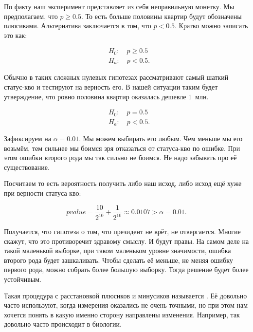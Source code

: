\documentclass[12pt, a4paper, oneside]{article}
\begin{document}
По факту наш эксперимент представляет из себя неправильную монетку. Мы предполагаем, что $p \ge 0.5$. То есть больше половины квартир будут обозначены плюсиками. Альтернатива заключается в том, что $p < 0.5$.  Кратко можно записать это как: 

\begin{equation*} 
    \begin{aligned} 
        &H_0: \quad p \ge 0.5 \\
        &H_a: \quad p < 0.5.
    \end{aligned} 
\end{equation*}

Обычно в таких сложных нулевых гипотезах рассматривают самый шаткий статус-кво и тестируют на верность его. В нашей ситуации таким будет утверждение, что ровно половина квартир оказалась дешевле $1$~млн.

\begin{equation*} 
    \begin{aligned} 
        &H_0: \quad p = 0.5 \\
        &H_a: \quad p < 0.5.
    \end{aligned} 
\end{equation*}

Зафиксируем  на $\alpha = 0.01.$ Мы можем выбирать его любым. Чем меньше мы его возьмём, тем сильнее мы боимся зря отказаться от статуса-кво по ошибке. При этом ошибки второго рода мы так сильно не боимся. Не надо забывать про её существование. 

Посчитаем  то есть вероятность получить либо наш исход, либо исход ещё хуже при верности статуса-кво: 

$$
pvalue = \frac{10}{2^{10}} + \frac{1}{2^{10}} \approx 0.0107 > \alpha = 0.01.
$$

Получается, что гипотеза о том, что президент не врёт, не отвергается. Многие скажут, что это противоречит здравому смыслу. И будут правы. На самом деле на такой маленькой выборке, при таком маленьком уровне значимости, ошибка второго рода будет зашкаливать. Чтобы сделать её меньше, не меняя ошибку первого рода, можно собрать более большую выборку. Тогда решение будет более устойчивым. 

Такая процедура с расстановкой плюсиков и минусиков называется . Её довольно часто используют, когда измерения оказались не очень точными, но при этом нам хочется понять в какую именно сторону направлены изменения. Например, так довольно часто происходит в биологии. 
\end{document}
